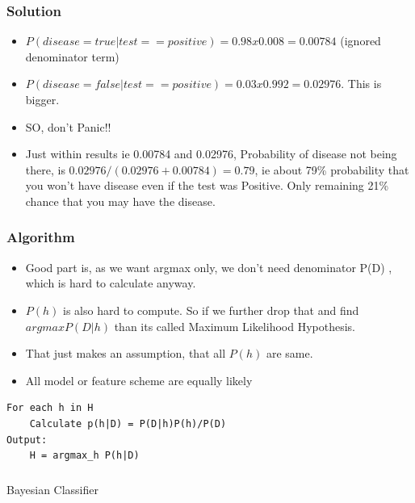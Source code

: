 


\begin{frame}[fragile]\frametitle{Solution}

\begin{itemize}
\item $P(disease=true|test==positive)= 0.98 x 0.008 = 0.00784$ (ignored denominator term)
\item $P(disease=false|test==positive)= 0.03x 0.992 = 0.02976$. This is bigger. 
\item SO, don’t Panic!!
\item Just within results ie 0.00784 and 0.02976, Probability of disease not being there, is $0.02976/(0.02976+0.00784) = 0.79$, ie about 79\% probability that you won’t have disease even if the test was Positive. Only remaining 21\% chance that you may have the disease.
\end{itemize}

\end{frame}

\begin{frame}[fragile]\frametitle{Algorithm}



\begin{itemize}
\item Good part is, as we want argmax only, we don’t need denominator P(D) , which is hard to calculate anyway.
\item $P(h)$ is also hard to compute. So if we further drop that and find $argmax P(D|h)$ than its called Maximum Likelihood Hypothesis. 
\item That just makes an assumption, that all $P(h)$ are same. 
\item All model or feature scheme are equally likely
\end{itemize}

\begin{lstlisting}
For each h in H
    Calculate p(h|D) = P(D|h)P(h)/P(D)
Output:
    H = argmax_h P(h|D)

\end{lstlisting}

\end{frame}

\begin{frame}[fragile]\frametitle{}
\begin{center}
{\Large Bayesian Classifier}
\end{center}

\end{frame}


